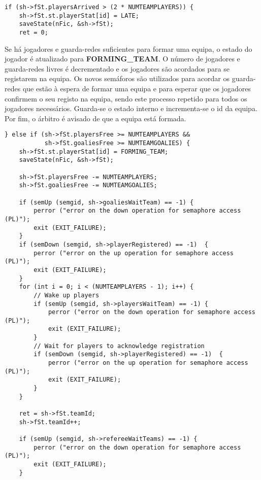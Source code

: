 \documentclass[code,math]{relatorio-deti}
\begin{document}
\begin{verbatim}
if (sh->fSt.playersArrived > (2 * NUMTEAMPLAYERS)) {
    sh->fSt.st.playerStat[id] = LATE;
    saveState(nFic, &sh->fSt);
    ret = 0;
\end{verbatim}

Se há jogadores e guarda-redes suficientes para formar uma equipa, o estado do jogador é atualizado para \textbf{FORMING\_TEAM}. O número de jogadores e guarda-redes livres é decrementado e os jogadores são acordados para se registarem na equipa. Os novos semáforos são utilizados para acordar os guarda-redes que estão à espera de formar uma equipa e para esperar que os jogadores confirmem o seu registo na equipa, sendo este processo repetido para todos os jogadores necessários. Guarda-se o estado interno e incrementa-se o id da equipa. Por fim, o árbitro é avisado de que a equipa está formada.

\begin{verbatim}
} else if (sh->fSt.playersFree >= NUMTEAMPLAYERS && 
           sh->fSt.goaliesFree >= NUMTEAMGOALIES) {
    sh->fSt.st.playerStat[id] = FORMING_TEAM;
    saveState(nFic, &sh->fSt);

    sh->fSt.playersFree -= NUMTEAMPLAYERS;
    sh->fSt.goaliesFree -= NUMTEAMGOALIES;

    if (semUp (semgid, sh->goaliesWaitTeam) == -1) {                                                         
        perror ("error on the down operation for semaphore access (PL)");
        exit (EXIT_FAILURE);
    }
    if (semDown (semgid, sh->playerRegistered) == -1)  {                                                     
        perror ("error on the up operation for semaphore access (PL)");
        exit (EXIT_FAILURE);
    }
    for (int i = 0; i < (NUMTEAMPLAYERS - 1); i++) {
        // Wake up players
        if (semUp (semgid, sh->playersWaitTeam) == -1) {                                                     
            perror ("error on the down operation for semaphore access (PL)");
            exit (EXIT_FAILURE);
        }
        // Wait for players to acknowledge registration
        if (semDown (semgid, sh->playerRegistered) == -1)  {                                                 
            perror ("error on the up operation for semaphore access (PL)");
            exit (EXIT_FAILURE);
        }
    }
    
    ret = sh->fSt.teamId;
    sh->fSt.teamId++;

    if (semUp (semgid, sh->refereeWaitTeams) == -1) {                                                         
        perror ("error on the down operation for semaphore access (PL)");
        exit (EXIT_FAILURE);
    }      
\end{verbatim}
\end{document}
